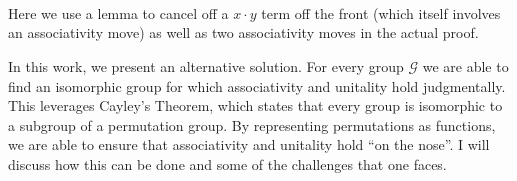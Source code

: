 \documentclass{article}
\begin{document}
\begin{code}
\AgdaSymbol{(}\AgdaSpace{}%
\AgdaSpace{}%
\AgdaSpace{}%
\AgdaSymbol{(}\AgdaSpace{}%
\AgdaSymbol{))}\AgdaSpace{}%
\<%
\\
%
\>[4]\AgdaSymbol{(((}\AgdaSpace{}%
\AgdaSpace{}%
\AgdaSymbol{)}\AgdaSpace{}%
\AgdaSpace{}%
\AgdaSpace{}%
\AgdaSymbol{)}\AgdaSpace{}%
\AgdaSpace{}%
\AgdaSpace{}%
\AgdaSymbol{)}\<%
\\
\>[4][@{}l@{\AgdaIndent{0}}]%
\>[5]\AgdaSpace{}%
\AgdaSpace{}%
\AgdaSymbol{(}\AgdaSpace{}%
\AgdaSymbol{(}\AgdaSpace{}%
\AgdaSpace{}%
\AgdaSymbol{)}\AgdaSpace{}%
\AgdaSymbol{(}\AgdaSpace{}%
\AgdaSymbol{)}\AgdaSpace{}%
\AgdaSymbol{(}\AgdaSpace{}%
\AgdaSymbol{))}\AgdaSpace{}%
\<%
\\
%
\>[4]\AgdaSymbol{((}\AgdaSpace{}%
\AgdaSpace{}%
\AgdaSymbol{)}\AgdaSpace{}%
\AgdaSpace{}%
\AgdaSpace{}%
\AgdaSpace{}%
\AgdaSpace{}%
\AgdaSpace{}%
\AgdaSymbol{)}\AgdaSpace{}%
\AgdaSymbol{)}\<%
\end{code}

Here we use a lemma to cancel off a \(x \cdot y\) term off the front (which itself involves an associativity move) as well as two associativity moves in the actual proof.

In this work, we present an alternative solution. For every group \(\mathcal{G}\) we are able to find an isomorphic group for which associativity and unitality hold judgmentally. This leverages Cayley's Theorem, which states that every group is isomorphic to a subgroup of a permutation group. By representing permutations as functions, we are able to ensure that associativity and unitality hold ``on the nose''. I will discuss how this can be done and some of the challenges that one faces.
\end{document}
